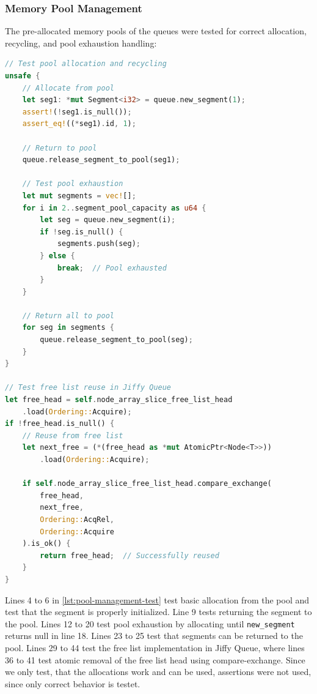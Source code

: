 \subsubsection{Memory Pool Management}
The pre-allocated memory pools of the queues were tested for correct allocation, recycling, and pool exhaustion handling:

\begin{lstlisting}[language=Rust, style=boxed, caption={Memory pool management test}, label={lst:pool-management-test}]
// Test pool allocation and recycling
unsafe {
    // Allocate from pool
    let seg1: *mut Segment<i32> = queue.new_segment(1);
    assert!(!seg1.is_null());
    assert_eq!((*seg1).id, 1);
    
    // Return to pool
    queue.release_segment_to_pool(seg1);
    
    // Test pool exhaustion
    let mut segments = vec![];
    for i in 2..segment_pool_capacity as u64 {
        let seg = queue.new_segment(i);
        if !seg.is_null() {
            segments.push(seg);
        } else {
            break;  // Pool exhausted
        }
    }
    
    // Return all to pool
    for seg in segments {
        queue.release_segment_to_pool(seg);
    }
}

// Test free list reuse in Jiffy Queue
let free_head = self.node_array_slice_free_list_head
    .load(Ordering::Acquire);
if !free_head.is_null() {
    // Reuse from free list
    let next_free = (*(free_head as *mut AtomicPtr<Node<T>>))
        .load(Ordering::Acquire);
        
    if self.node_array_slice_free_list_head.compare_exchange(
        free_head, 
        next_free, 
        Ordering::AcqRel, 
        Ordering::Acquire
    ).is_ok() {
        return free_head;  // Successfully reused
    }
}
\end{lstlisting}

Lines 4 to 6 in \cref{lst:pool-management-test} test basic allocation from the pool and test that the segment is properly initialized. Line 9 tests returning the segment to the pool. Lines 12 to 20 test pool exhaustion by allocating until \texttt{new\_segment} returns null in line 18. Lines 23 to 25 test that segments can be returned to the pool. Lines 29 to 44 test the free list implementation in Jiffy Queue, where lines 36 to 41 test atomic removal of the free list head using compare-exchange. Since we only test, that the allocations work and can be used, assertions were not used, since only correct behavior is testet.

